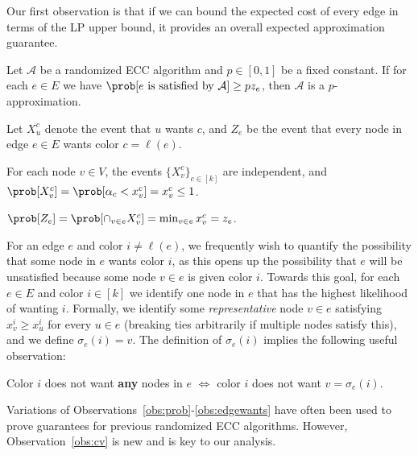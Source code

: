 Our first observation is that if we can bound the expected cost of every edge in terms of the LP upper bound, it provides an overall expected approximation guarantee.
\begin{observation}
	\label{obs:prob}
	Let $\mathcal{A}$ be a randomized ECC algorithm and $p \in [0,1]$ be a fixed constant. If for each $e \in E$ we have $\prob[\text{$e$ is satisfied by  $\mathcal{A}$}] \geq p z_e$, then $\mathcal{A}$ is a $p$-approximation.
\end{observation}
Let $X_u^c$ denote the event that $u$ wants $c$, and $Z_e$ be the event that every node in edge $e \in E$ wants color $c = \ell(e)$.
\begin{observation}
	\label{obs:xuc}
	For each node $v \in V$, the events $\{X_v^c\}_{c \in [k]}$ are independent, and $\prob[X_v^c] = \prob[\alpha_c < x_v^c] = x_v^c \leq 1$.
\end{observation}
\begin{observation}
	\label{obs:edgewants}
	$\prob[Z_e] = \prob[\cap_{v \in e} X_v^c] = \min_{v \in e} x_v^c = z_e$.
\end{observation}

For an edge $e$ and color $i \neq \ell(e)$, we frequently wish to quantify the possibility that some node in $e$ wants color $i$, as this opens up the possibility that $e$ will be unsatisfied because some node $v \in e$ is given color $i$. Towards this goal, for each $e \in E$ and color $i \in [k]$ we identify one node in $e$ that has the highest likelihood of wanting $i$. Formally, we identify some \emph{representative} node $v \in e$ satisfying $x_v^i \geq x_u^i$ for every $u \in e$ (breaking ties arbitrarily if multiple nodes satisfy this), and we define $\sigma_e(i) = v$.
The definition of $\sigma_e(i)$ implies the following useful observation:
\begin{observation}
	\label{obs:cv}
	Color $i$ does not want \textbf{any} nodes in $e$ $\iff$ color $i$ does not want $v = \sigma_e(i)$.
\end{observation}
Variations of Observations~\ref{obs:prob}-\ref{obs:edgewants} have often been used to prove guarantees for previous randomized ECC algorithms. However, Observation~\ref{obs:cv} is new and is key to our analysis.



